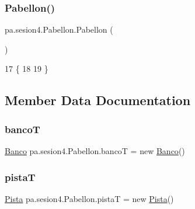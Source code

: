 \subsubsection{\texorpdfstring{Pabellon()}{Pabellon()}}
{\footnotesize\ttfamily pa.\+sesion4.\+Pabellon.\+Pabellon (\begin{DoxyParamCaption}{ }\end{DoxyParamCaption})\hspace{0.3cm}{\ttfamily [inline]}}


\begin{DoxyCode}
17     \{
18         
19     \}
\end{DoxyCode}


\subsection{Member Data Documentation}
\mbox{\label{classpa_1_1sesion4_1_1_pabellon_a90ebd634e348df738f11e263ce3723e6}} 
\subsubsection{\texorpdfstring{bancoT}{bancoT}}
{\footnotesize\ttfamily \mbox{\hyperlink{classpa_1_1sesion4_1_1_banco}{Banco}} pa.\+sesion4.\+Pabellon.\+bancoT = new \mbox{\hyperlink{classpa_1_1sesion4_1_1_banco}{Banco}}()\hspace{0.3cm}{\ttfamily [package]}}

\mbox{\label{classpa_1_1sesion4_1_1_pabellon_a6cd83e22a40624083b6a0ab7a5b185cb}} 
\subsubsection{\texorpdfstring{pistaT}{pistaT}}
{\footnotesize\ttfamily \mbox{\hyperlink{classpa_1_1sesion4_1_1_pista}{Pista}} pa.\+sesion4.\+Pabellon.\+pistaT = new \mbox{\hyperlink{classpa_1_1sesion4_1_1_pista}{Pista}}()\hspace{0.3cm}{\ttfamily [package]}}

